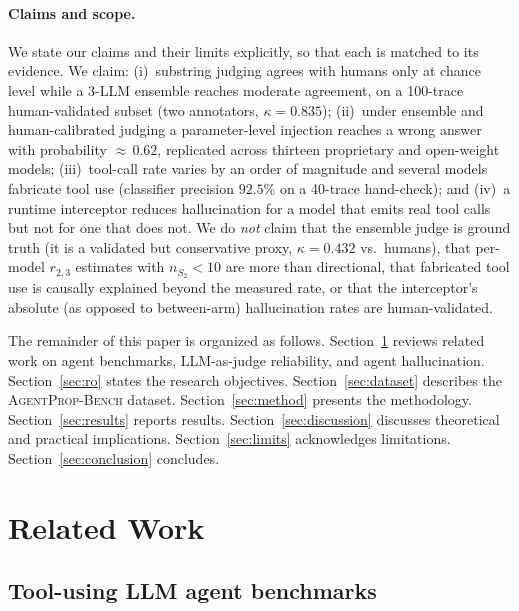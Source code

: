 \documentclass{article}
\newcommand{\bench}{\textsc{AgentProp-Bench}\xspace}
\begin{document}
\paragraph{Claims and scope.}
We state our claims and their limits explicitly, so that each is matched to its
evidence. We claim: (i)~substring judging agrees with humans only at chance
level while a 3-LLM ensemble reaches moderate agreement, on a 100-trace
human-validated subset (two annotators, $\kappa{=}0.835$); (ii)~under
ensemble and human-calibrated judging a parameter-level injection reaches a
wrong answer with probability ${\approx}\,0.62$, replicated across thirteen
proprietary and open-weight models; (iii)~tool-call rate varies by an order of
magnitude and several models fabricate tool use (classifier precision
$92.5\%$ on a 40-trace hand-check); and (iv)~a runtime interceptor reduces
hallucination for a model that emits real tool calls but not for one that does
not. We do \emph{not} claim that the ensemble judge is ground truth (it is a
validated but conservative proxy, $\kappa{=}0.432$ vs.\ humans), that per-model
$r_{2,3}$ estimates with $n_{S_2}{<}10$ are more than directional, that
fabricated tool use is causally explained beyond the measured rate, or that the
interceptor's absolute (as opposed to between-arm) hallucination rates are
human-validated.

The remainder of this paper is organized as follows.
Section~\ref{sec:related} reviews related work on agent benchmarks,
LLM-as-judge reliability, and agent hallucination.
Section~\ref{sec:ro} states the research objectives.
Section~\ref{sec:dataset} describes the \bench{} dataset.
Section~\ref{sec:method} presents the methodology.
Section~\ref{sec:results} reports results.
Section~\ref{sec:discussion} discusses theoretical and practical
implications.
Section~\ref{sec:limits} acknowledges limitations.
Section~\ref{sec:conclusion} concludes.


\section{Related Work}
\label{sec:related}

\subsection{Tool-using LLM agent benchmarks}
\end{document}
